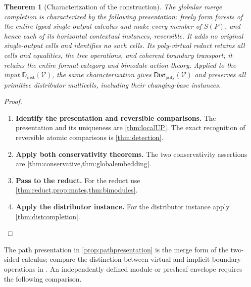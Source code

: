 \documentclass[11pt,reqno]{amsart}
\theoremstyle{plain}
\newtheorem{theorem}{Theorem}[section]
\theoremstyle{definition}
\theoremstyle{remark}
\numberwithin{equation}{section}
\newcommand{\V}{\mathcal V}
\newcommand{\Ddist}{\mathbb D_{\mathrm{dist}}}
\newcommand{\FDist}{\mathsf{Dist}_{\mathrm{poly}}}
\begin{document}
\begin{theorem}[Characterization of the construction]
The globular merge completion is characterized by the following
presentation: freely form forests of the entire typed single-output
calculus and make every member of $S(P)$, and hence each of its horizontal
contextual instances, reversible.
It adds no original single-output cells and identifies no such cells.
Its poly-virtual reduct retains all cells and equalities, the tree
operations, and coherent boundary transport; it retains the entire
formal-category and bimodule-action theory.
Applied to the input $\Ddist(\V)$, the same characterization gives
$\FDist(\V)$ and preserves all primitive distributor multicells,
including their changing-base instances.
\end{theorem}
\begin{proof}\leavevmode
\begin{enumerate}
\item \textbf{Identify the presentation and reversible comparisons.} The presentation and its uniqueness are \cref{thm:localUP}.
The exact recognition of reversible atomic comparisons is
\cref{thm:detection}.

\item \textbf{Apply both conservativity theorems.} The two conservativity assertions are
\cref{thm:conservative,thm:globalembedding}.

\item \textbf{Pass to the reduct.} For the reduct use
\cref{thm:reduct,prop:mates,thm:bimodules}.

\item \textbf{Apply the distributor instance.} For the distributor instance apply \cref{thm:distcompletion}.\qedhere
\end{enumerate}
\end{proof}

The path presentation in \cref{prop:pathpresentation} is the merge
form of the two-sided calculus; compare the distinction between virtual
and implicit boundary operations in
\cite[Remark 1.1]{FairbanksShulman2025}. An independently defined module
or presheaf envelope requires the following comparison.
\end{document}
